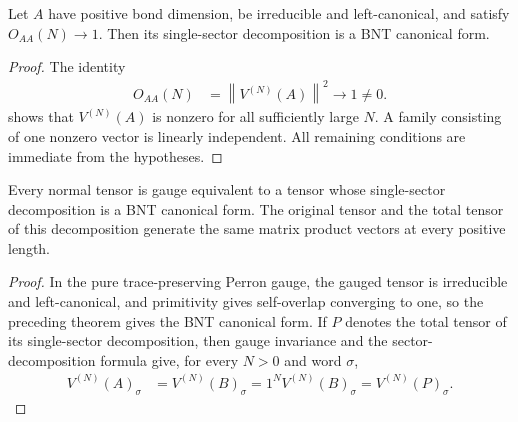 \begin{lemma}
    \label{thm:single_sector_decomposition_bnt}
    \leanok
    Let $A$ have positive bond dimension, be irreducible and left-canonical,
    and satisfy $O_{AA}(N)\longrightarrow1$. Then its single-sector
    decomposition is a BNT canonical form.
\end{lemma}

\begin{proof}\leanok
    The identity
    \begin{align}
        O_{AA}(N)
         & =\left\lVert V^{(N)}(A)\right\rVert^2
        \longrightarrow 1\ne0.
    \end{align}
    shows that $V^{(N)}(A)$ is nonzero for all sufficiently large $N$.
    A family consisting of one nonzero vector is linearly independent. All
    remaining conditions are immediate from the hypotheses.
\end{proof}

\begin{lemma}
    \label{thm:normal_single_sector_bnt_gauge}
    \leanok
    Every normal tensor is gauge equivalent to a tensor whose single-sector
    decomposition is a BNT canonical form. The original tensor and the total
    tensor of this decomposition generate the same matrix product vectors at
    every positive length.
\end{lemma}

\begin{proof}\leanok
    In the pure trace-preserving Perron gauge, the gauged tensor is irreducible
    and left-canonical, and primitivity gives self-overlap converging to one,
    so the preceding theorem gives the BNT canonical form. If $P$ denotes
    the total tensor of its single-sector decomposition, then gauge invariance
    and the sector-decomposition formula give, for every $N>0$ and word
    $\sigma$,
    \begin{align}
        V^{(N)}(A)_\sigma
         & =V^{(N)}(B)_\sigma
        =1^N V^{(N)}(B)_\sigma
        =V^{(N)}(P)_\sigma.
    \end{align}
\end{proof}

